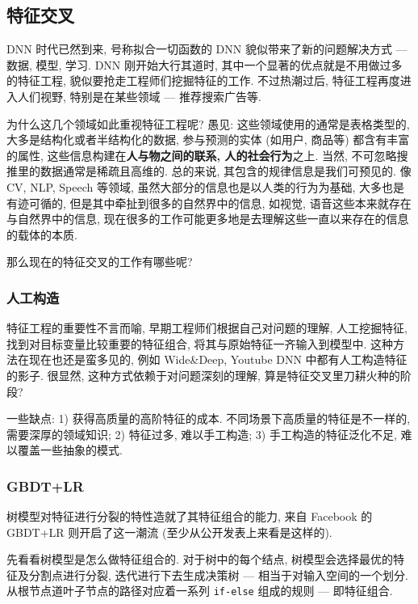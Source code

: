 \subsection{特征交叉}
DNN 时代已然到来, 号称拟合一切函数的 DNN 貌似带来了新的问题解决方式 --- 数据, 模型, 学习. DNN 刚开始大行其道时, 其中一个显著的优点就是不用做过多的特征工程, 貌似要抢走工程师们挖掘特征的工作. 不过热潮过后, 特征工程再度进入人们视野, 特别是在某些领域 --- 推荐搜索广告等. 

为什么这几个领域如此重视特征工程呢? 愚见: 这些领域使用的通常是表格类型的, 大多是结构化或者半结构化的数据, 参与预测的实体 (如用户, 商品等) 都含有丰富的属性, 这些信息构建在\textbf{人与物之间的联系, 人的社会行为}之上. 当然, 不可忽略搜推里的数据通常是稀疏且高维的. 总的来说, 其包含的规律信息是我们可预见的. 像 CV,  NLP, Speech 等领域, 虽然大部分的信息也是以人类的行为为基础, 大多也是有迹可循的, 但是其中牵扯到很多的自然界中的信息, 如视觉, 语音这些本来就存在与自然界中的信息, 现在很多的工作可能更多地是去理解这些一直以来存在的信息的载体的本质. 

那么现在的特征交叉的工作有哪些呢?

\subsubsection{人工构造}

特征工程的重要性不言而喻, 早期工程师们根据自己对问题的理解, 人工挖掘特征, 找到对目标变量比较重要的特征组合, 将其与原始特征一齐输入到模型中. 这种方法在现在也还是蛮多见的, 例如 Wide\&Deep, Youtube DNN 中都有人工构造特征的影子. 很显然, 这种方式依赖于对问题深刻的理解, 算是特征交叉里刀耕火种的阶段?

一些缺点: 1) 获得高质量的高阶特征的成本. 不同场景下高质量的特征是不一样的, 需要深厚的领域知识; 2) 特征过多, 难以手工构造; 3) 手工构造的特征泛化不足, 难以覆盖一些抽象的模式.

\subsubsection{GBDT+LR}

树模型对特征进行分裂的特性造就了其特征组合的能力, 来自 Facebook 的 GBDT+LR\cite{he_gbdtlr_2014} 则开启了这一潮流 (至少从公开发表上来看是这样的). 

先看看树模型是怎么做特征组合的. 对于树中的每个结点, 树模型会选择最优的特征及分割点进行分裂, 迭代进行下去生成决策树 --- 相当于对输入空间的一个划分. 从根节点道叶子节点的路径对应着一系列 \texttt{if-else} 组成的规则 --- 即特征组合. 

